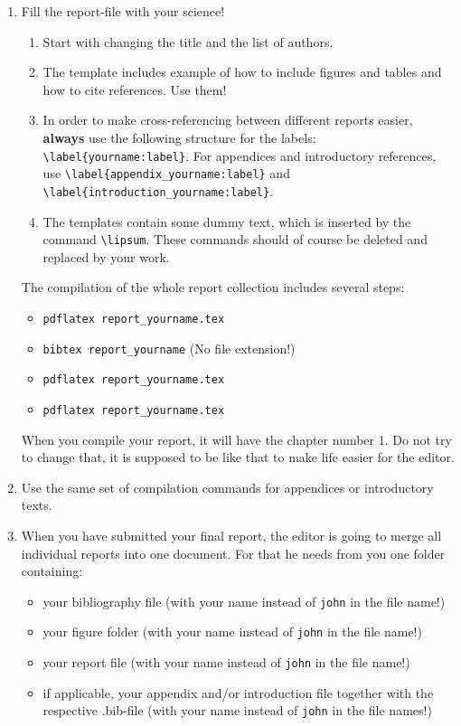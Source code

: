 \documentclass[11pt,a4paper]{article}
\begin{document}
\begin{enumerate}
   \item Fill the report-file with your science!
   \begin{enumerate}
       \item Start with changing the title and the list of authors.
       \item The template includes example of how to include figures and tables and how to cite references. Use them!
       \item In order to make cross-referencing between different reports easier, \textbf{always} use the following structure for the labels: \texttt{\textbackslash label\{yourname:label\}}. For appendices and introductory references, use \texttt{\textbackslash label\{appendix\_yourname:label\}} and \texttt{\textbackslash label\{introduction\_yourname:label\}}.
       \item The templates contain some dummy text, which is inserted by the command \texttt{\textbackslash lipsum}. These commands should of course be deleted and replaced by your work.
    \end{enumerate}
    
    The compilation of the whole report collection includes several steps:
    \begin{itemize}
        \item \texttt{pdflatex report\_yourname.tex}
        \item \texttt{bibtex report\_yourname} (No file extension!)
        \item \texttt{pdflatex report\_yourname.tex}
        \item \texttt{pdflatex report\_yourname.tex}
   \end{itemize}
    When you compile your report, it will have the chapter number 1. Do not try to change that, it is supposed to be like that to make life easier for the editor.
    
    \item Use the same set of compilation commands for appendices or introductory texts.
   
   \item When you have submitted your final report, the editor is going to merge all individual reports into one document. For that he needs from you one folder containing:
   \begin{itemize}
       \item your bibliography file (with your name instead of \texttt{john} in the file name!)
       \item your figure folder (with your name instead of \texttt{john} in the file name!)
       \item your report file (with your name instead of \texttt{john} in the file name!)
       \item if applicable, your appendix and/or introduction file together with the respective .bib-file (with your name instead of \texttt{john} in the file names!)
   \end{itemize}
 \end{enumerate}
\end{document}
